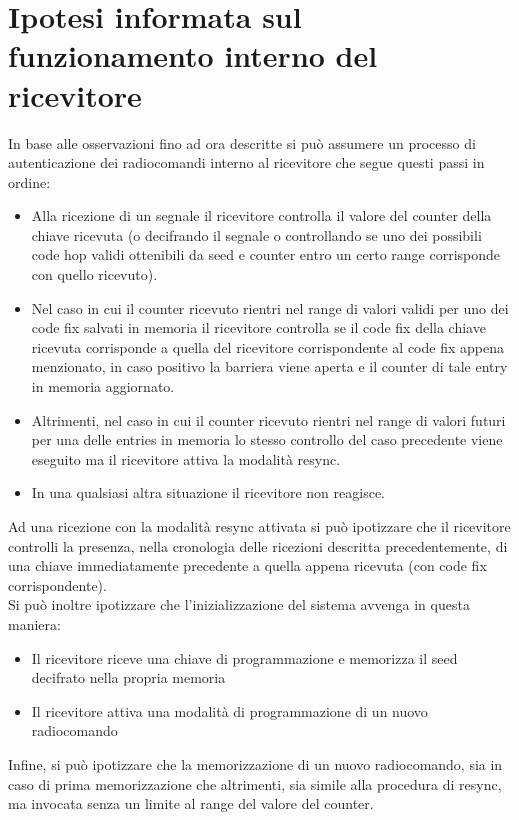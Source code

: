 \section{Ipotesi informata sul funzionamento interno del ricevitore}
\label{sec:ipothesis}

In base alle osservazioni fino ad ora descritte si può assumere un processo di autenticazione dei radiocomandi interno al ricevitore che segue questi passi in ordine:
\begin{itemize}
  \item Alla ricezione di un segnale il ricevitore controlla il valore del counter della chiave ricevuta (o decifrando il segnale o controllando se uno dei possibili code hop validi ottenibili da seed e counter entro un certo range corrisponde con quello ricevuto).
  \item Nel caso in cui il counter ricevuto rientri nel range di valori validi per uno dei code fix salvati in memoria il ricevitore controlla se il code fix della chiave ricevuta corrisponde a quella del ricevitore corrispondente al code fix appena menzionato, in caso positivo la barriera viene aperta e il counter di tale entry in memoria aggiornato.
  \item Altrimenti, nel caso in cui il counter ricevuto rientri nel range di valori futuri per una delle entries in memoria lo stesso controllo del caso precedente viene eseguito ma il ricevitore attiva la modalità resync.
  \item In una qualsiasi altra situazione il ricevitore non reagisce.
\end{itemize}
Ad una ricezione con la modalità resync attivata si può ipotizzare che il ricevitore controlli la presenza, nella cronologia delle ricezioni descritta precedentemente, di una chiave immediatamente precedente a quella appena ricevuta (con code fix corrispondente).\\
Si può inoltre ipotizzare che l’inizializzazione del sistema avvenga in questa maniera:
\begin{itemize}
  \item Il ricevitore riceve una chiave di programmazione e memorizza il seed decifrato nella propria memoria
  \item Il ricevitore attiva una modalità di programmazione di un nuovo radiocomando
\end{itemize}
Infine, si può ipotizzare che la memorizzazione di un nuovo radiocomando, sia in caso di prima memorizzazione che altrimenti, sia simile alla procedura di resync, ma invocata senza un limite al range del valore del counter.

